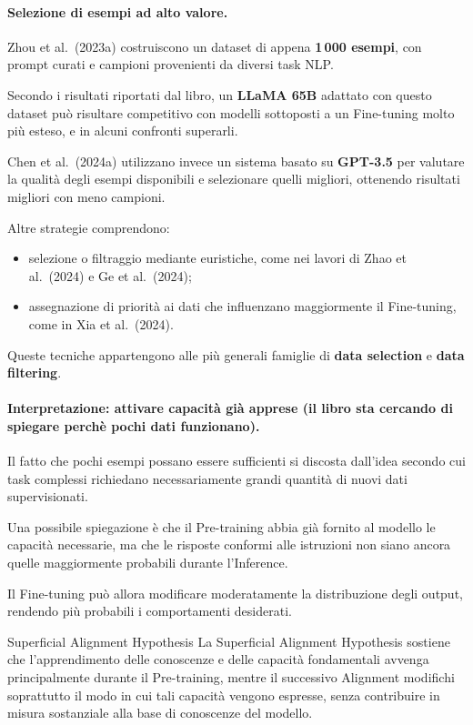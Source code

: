 \paragraph{Selezione di esempi ad alto valore.}
Zhou et al.\ (2023a) costruiscono un dataset
di appena \textbf{1\,000 esempi}, con prompt
curati e campioni provenienti da diversi task NLP.

Secondo i risultati riportati dal libro,
un \textbf{LLaMA 65B} adattato con questo dataset
può risultare competitivo con modelli sottoposti
a un Fine-tuning molto più esteso,
e in alcuni confronti superarli.

Chen et al.\ (2024a) utilizzano invece un sistema
basato su \textbf{GPT-3.5} per valutare la qualità
degli esempi disponibili e selezionare quelli migliori,
ottenendo risultati migliori con meno campioni.

Altre strategie comprendono:

\begin{itemize}
    \item selezione o filtraggio mediante euristiche,
    come nei lavori di Zhao et al.\ (2024)
    e Ge et al.\ (2024);

    \item assegnazione di priorità ai dati
    che influenzano maggiormente il Fine-tuning,
    come in Xia et al.\ (2024).
\end{itemize}

Queste tecniche appartengono alle più generali
famiglie di \textbf{data selection}
e \textbf{data filtering}.

\paragraph{Interpretazione: attivare capacità già apprese (il libro sta cercando di spiegare perchè pochi dati funzionano).}
Il fatto che pochi esempi possano essere sufficienti
si discosta dall'idea secondo cui task complessi
richiedano necessariamente grandi quantità
di nuovi dati supervisionati.

Una possibile spiegazione è che il Pre-training
abbia già fornito al modello le capacità necessarie,
ma che le risposte conformi alle istruzioni
non siano ancora quelle maggiormente probabili
durante l'Inference.

Il Fine-tuning può allora modificare moderatamente
la distribuzione degli output, rendendo più probabili
i comportamenti desiderati.

\begin{definition}{Superficial Alignment Hypothesis}
La Superficial Alignment Hypothesis sostiene che
l'apprendimento delle conoscenze e delle capacità
fondamentali avvenga principalmente durante
il Pre-training, mentre il successivo Alignment
modifichi soprattutto il modo in cui tali capacità
vengono espresse, senza contribuire in misura
sostanziale alla base di conoscenze del modello.
\end{definition}

